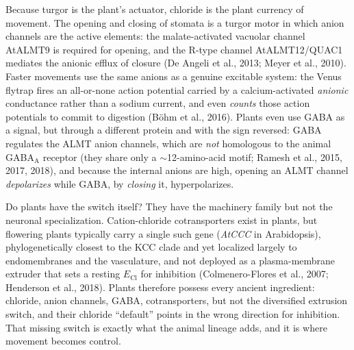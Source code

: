 \documentclass[11pt,a4paper]{article}
\newcommand{\ECl}{E_{\mathrm{Cl}}}
\begin{document}
Because turgor is the plant's actuator, chloride is the plant currency of movement. The opening and closing of stomata is a turgor motor in which anion channels are the active elements: the malate-activated vacuolar channel AtALMT9 is required for opening, and the R-type channel AtALMT12/QUAC1 mediates the anionic efflux of closure (De Angeli et al., 2013; Meyer et al., 2010). Faster movements use the same anions as a genuine excitable system: the Venus flytrap fires an all-or-none action potential carried by a calcium-activated \emph{anionic} conductance rather than a sodium current, and even \emph{counts} those action potentials to commit to digestion (B\"ohm et al., 2016). Plants even use GABA as a signal, but through a different protein and with the sign reversed: GABA regulates the ALMT anion channels, which are \emph{not} homologous to the animal GABA$_{\mathrm{A}}$ receptor (they share only a $\sim$12-amino-acid motif; Ramesh et al., 2015, 2017, 2018), and because the internal anions are high, opening an ALMT channel \emph{depolarizes} while GABA, by \emph{closing} it, hyperpolarizes.

Do plants have the switch itself? They have the machinery family but not the neuronal specialization. Cation-chloride cotransporters exist in plants, but flowering plants typically carry a single such gene (\emph{AtCCC} in Arabidopsis), phylogenetically closest to the KCC clade and yet localized largely to endomembranes and the vasculature, and not deployed as a plasma-membrane extruder that sets a resting $\ECl$ for inhibition (Colmenero-Flores et al., 2007; Henderson et al., 2018). Plants therefore possess every ancient ingredient: chloride, anion channels, GABA, cotransporters, but not the diversified extrusion switch, and their chloride ``default'' points in the wrong direction for inhibition. That missing switch is exactly what the animal lineage adds, and it is where movement becomes control.

\FloatBarrier
\end{document}

